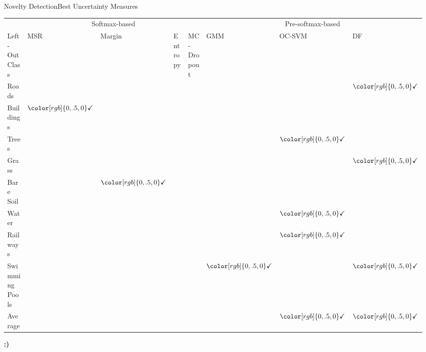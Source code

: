 \documentclass[xcolor={usenames,dvipsnames}]{beamer}
\begin{document}
\newcommand{\tick}{${\color[rgb]{0, .5, 0}\mathbf{\checkmark}}$}

\begin{frame}{Novelty Detection}{Best Uncertainty Measures}
	\begin{table}[H]
		\centering
		\footnotesize
		\begin{tabular}{@{}l|llll|lll@{}}
			\toprule
			&\multicolumn{4}{c}{Softmax-based} &  \multicolumn{3}{|c}{Pre-softmax-based} \\
			Left-Out Class & MSR  & Margin     & Entropy & \acrshort{MC-Dropout} & \acrshort{GMM}     & \acrshort{OC-SVM}  & \acrshort{DF}                \\ \midrule
			Roads          &   &    &     &   &  &  &  \tick \\
			Buildings    & \tick  &    &     &   &  &  &   \\
			Trees          &   &    &     &   &  &   \tick &\\ 
			Grass          &   &    &     &   &  &  &  \tick \\ 
			Bare Soil      &   & \tick   &     &   &  &  &   \\ 
			Water          &   &    &     &   &  &  \tick &   \\ 
			Railways       &   &    &     &   &  & \tick &   \\ 
			Swimming Pools &   &    &     &   &  \tick  &  &  \tick \\ \midrule
			Average       &   &    &     &   &  &  \tick &   \tick \\ \bottomrule
		\end{tabular}
	\end{table}
	\pause
	\centering
	{\color{greenWUR}\textbf{:)}}
\end{frame}
\end{document}
